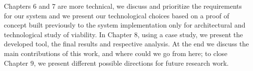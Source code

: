 \indent Chapters 6 and 7 are more technical, we discuss and prioritize the requirements for our system and we present our technological choices based on a proof of concept built previously to the system implementation only for architectural and technological study of viability. In Chapter 8, using a case study, we present the developed tool, the final results and respective analysis. At the end we discuss the main contributions of this work, and where could we go from here; to close Chapter 9, we present different possible directions for future research work.
